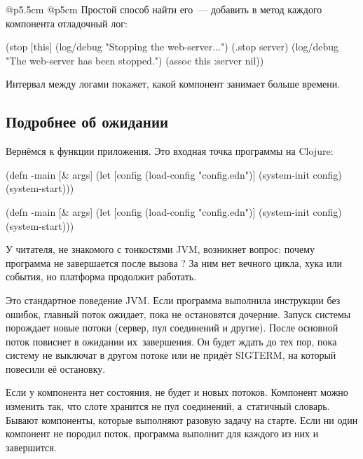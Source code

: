 \begin{tabular}{ @{}p{5.5cm} @{}p{5cm} }
Простой способ найти его~--- добавить в метод  каждого компонента
отладочный лог:

\begin{clojure}
(stop [this]
  (log/debug "Stopping the web-server...")
  (.stop server)
  (log/debug "The web-server has been stopped.")
  (assoc this :server nil))
\end{clojure}

Интервал между логами покажет, какой компонент занимает больше времени.

\subsection{Подробнее об ожидании}


Вернёмся к функции  приложения. Это входная точка программы на
Clojure:

\ifnarrow

\begin{clojure}
(defn -main [& args]
  (let [config
        (load-config "config.edn")]
    (system-init config)
    (system-start)))
\end{clojure}

\else

\begin{clojure}
(defn -main [& args]
  (let [config (load-config "config.edn")]
    (system-init config)
    (system-start)))
\end{clojure}

\fi

У читателя, не знакомого с тонкостями JVM, возникнет вопрос: почему программа не
завершается после вызова ? За ним нет вечного цикла, хука
или события, но платформа продолжит работать.


Это стандартное поведение JVM. Если программа выполнила инструкции без ошибок,
главный поток ожидает, пока не остановятся дочерние. Запуск системы порождает
новые потоки (сервер, пул соединений и другие). После 
основной поток повиснет в ожидании их~завершения. Он будет ждать до тех пор,
пока систему не выключат в другом потоке или не придёт SIGTERM, на который
повесили её остановку.

Если у компонента нет состояния, не будет и новых потоков. Компонент 
можно изменить так, что слоте  хранится не пул соединений,
а~статичный словарь. Бывают компоненты, которые выполняют разовую задачу на
старте. Если ни один компонент не породил поток, программа выполнит 
для каждого из них и завершится.


\end{tabular}
